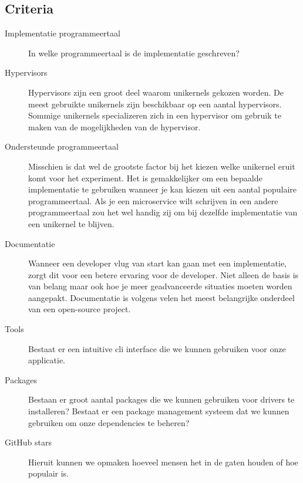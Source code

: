 \documentclass[pdftex,a4paper,12pt,twoside]{report}
\begin{document}
\subsection{Criteria}

\begin{description}
\item [Implementatie programmeertaal] In welke programmeertaal is de implementatie geschreven?
\item [Hypervisors] Hypervisors zijn een groot deel waarom unikernels gekozen worden. De meest gebruikte unikernels zijn beschikbaar op een aantal hypervisors. Sommige unikernels specializeren zich in een hypervisor om gebruik te maken van de mogelijkheden van de hypervisor.
\item [Ondersteunde programmeertaal] Misschien is dat wel de grootste factor bij het kiezen welke unikernel eruit komt voor het experiment. Het is gemakkelijker om een bepaalde implementatie te gebruiken wanneer je kan kiezen uit een aantal populaire programmeertaal. Als je een microservice wilt schrijven in een andere programmeertaal zou het wel handig zij om bij dezelfde implementatie van een unikernel te blijven.
\item [Documentatie] Wanneer een developer vlug van start kan gaan met een implementatie, zorgt dit voor een betere ervaring voor de developer. Niet alleen de basis is van belang maar ook hoe je meer geadvanceerde situaties moeten worden aangepakt. Documentatie is volgens velen het meest belangrijke onderdeel van een open-source project.
\item [Tools] Bestaat er een intuitive cli interface die we kunnen gebruiken voor onze applicatie.
\item [Packages] Bestaan er groot aantal packages die we kunnen gebruiken voor drivers te installeren? Bestaat er een package management systeem dat we kunnen gebruiken om onze dependencies te beheren?
\item [GitHub stars] Hieruit kunnen we opmaken hoeveel mensen het in de gaten houden of hoe populair is. 
\end{description}
\end{document}

